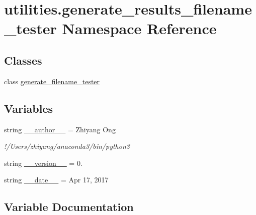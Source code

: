 \hypertarget{namespaceutilities_1_1generate__results__filename__tester}{}\section{utilities.\+generate\+\_\+results\+\_\+filename\+\_\+tester Namespace Reference}
\label{namespaceutilities_1_1generate__results__filename__tester}
\subsection*{Classes}
\begin{DoxyCompactItemize}
\item 
class \hyperlink{classutilities_1_1generate__results__filename__tester_1_1generate__filename__tester}{generate\+\_\+filename\+\_\+tester}
\end{DoxyCompactItemize}
\subsection*{Variables}
\begin{DoxyCompactItemize}
\item 
string \hyperlink{namespaceutilities_1_1generate__results__filename__tester_aeb3c7d9ee34db57c409e693157f0cceb}{\+\_\+\+\_\+author\+\_\+\+\_\+} = \textquotesingle{}Zhiyang Ong\textquotesingle{}
\begin{DoxyCompactList}\small\item\em !/\+Users/zhiyang/anaconda3/bin/python3 \end{DoxyCompactList}\item 
string \hyperlink{namespaceutilities_1_1generate__results__filename__tester_a36b6e38cf86170c416ee9e059c4579ee}{\+\_\+\+\_\+version\+\_\+\+\_\+} = \textquotesingle{}0.\textquotesingle{}
\item 
string \hyperlink{namespaceutilities_1_1generate__results__filename__tester_afe7e0ae314b84c1b0fc443a6dcbc6ba3}{\+\_\+\+\_\+date\+\_\+\+\_\+} = \textquotesingle{}Apr 17, 2017\textquotesingle{}
\end{DoxyCompactItemize}


\subsection{Variable Documentation}
\hypertarget{namespaceutilities_1_1generate__results__filename__tester_aeb3c7d9ee34db57c409e693157f0cceb}{}
